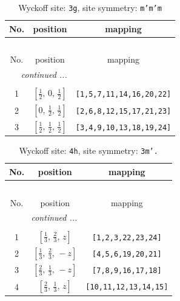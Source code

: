 \documentclass[fleqn,8pt]{jsarticle}
\begin{document}
\begin{longtable}{ccc}
\caption{Wyckoff site: {\tt 3g}, site symmetry: {\tt m'm'm}}
 \\
 \hline \hline
No. & position & mapping \\ \hline \endfirsthead

\multicolumn{2}{l}{\tablename\ \thetable{}} \\
 \hline \hline
No. & position & mapping \\ \hline \endhead

 \hline \hline
\multicolumn{2}{r}{\footnotesize\it continued ...} \\ \endfoot

 \hline \hline
\multicolumn{2}{r}{} \\ \endlastfoot

1 & $\left[ \frac{1}{2},\, 0,\, \frac{1}{2} \right]$ & {\tt [1,5,7,11,14,16,20,22]} \\ \hline
2 & $\left[ 0,\, \frac{1}{2},\, \frac{1}{2} \right]$ & {\tt [2,6,8,12,15,17,21,23]} \\ \hline
3 & $\left[ \frac{1}{2},\, \frac{1}{2},\, \frac{1}{2} \right]$ & {\tt [3,4,9,10,13,18,19,24]} \\
\end{longtable}
\renewcommand{\arraystretch}{1.2}
\begin{longtable}{ccc}
\caption{Wyckoff site: {\tt 4h}, site symmetry: {\tt 3m'.}}
 \\
 \hline \hline
No. & position & mapping \\ \hline \endfirsthead

\multicolumn{2}{l}{\tablename\ \thetable{}} \\
 \hline \hline
No. & position & mapping \\ \hline \endhead

 \hline \hline
\multicolumn{2}{r}{\footnotesize\it continued ...} \\ \endfoot

 \hline \hline
\multicolumn{2}{r}{} \\ \endlastfoot

1 & $\left[ \frac{1}{3},\, \frac{2}{3},\, z \right]$ & {\tt [1,2,3,22,23,24]} \\ \hline
2 & $\left[ \frac{1}{3},\, \frac{2}{3},\, - z \right]$ & {\tt [4,5,6,19,20,21]} \\ \hline
3 & $\left[ \frac{2}{3},\, \frac{1}{3},\, - z \right]$ & {\tt [7,8,9,16,17,18]} \\ \hline
4 & $\left[ \frac{2}{3},\, \frac{1}{3},\, z \right]$ & {\tt [10,11,12,13,14,15]} \\
\end{longtable}
\end{document}
